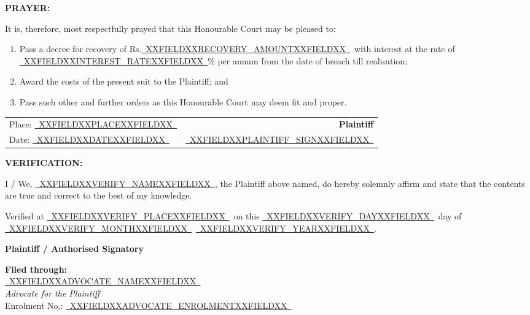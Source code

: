 \documentclass[12pt,a4paper]{article}
\newcommand{\fillline}[1]{\underline{~#1~}}
\begin{document}
\textbf{PRAYER:}

It is, therefore, most respectfully prayed that this Honourable Court may be pleased to:

\begin{enumerate}[leftmargin=*, label=(\alph*), itemsep=6pt, topsep=4pt]
  \item Pass a decree for recovery of Rs.\fillline{XXFIELDXXRECOVERY_AMOUNTXXFIELDXX}\ with interest at the rate of
        \fillline{XXFIELDXXINTEREST_RATEXXFIELDXX}\% per annum from the date of breach till realisation;
  \item Award the costs of the present suit to the Plaintiff; and
  \item Pass such other and further orders as this Honourable Court may deem fit and proper.
\end{enumerate}

\vspace{20pt}

\noindent
\begin{tabularx}{\textwidth}{@{}X r@{}}
  Place: \fillline{XXFIELDXXPLACEXXFIELDXX} & \textbf{Plaintiff} \\[10pt]
  Date: \fillline{XXFIELDXXDATEXXFIELDXX}  & \fillline{XXFIELDXXPLAINTIFF_SIGNXXFIELDXX} \\
\end{tabularx}

\vspace{20pt}

\textbf{VERIFICATION:}

I / We, \fillline{XXFIELDXXVERIFY_NAMEXXFIELDXX}, the Plaintiff above named, do hereby solemnly
affirm and state that the contents are true and correct to the best of my knowledge.

\vspace{8pt}
Verified at \fillline{XXFIELDXXVERIFY_PLACEXXFIELDXX}\ on this \fillline{XXFIELDXXVERIFY_DAYXXFIELDXX}\ day of
\fillline{XXFIELDXXVERIFY_MONTHXXFIELDXX}\ \fillline{XXFIELDXXVERIFY_YEARXXFIELDXX}.

\vspace{18pt}
\hfill\textbf{Plaintiff / Authorised Signatory}

\vspace{20pt}

\textbf{Filed through:}\\[6pt]
\fillline{XXFIELDXXADVOCATE_NAMEXXFIELDXX}\\
\textit{Advocate for the Plaintiff}\\[4pt]
Enrolment No.: \fillline{XXFIELDXXADVOCATE_ENROLMENTXXFIELDXX}
\end{document}
